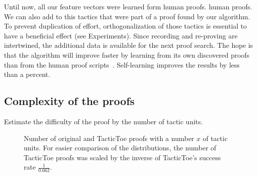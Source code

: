 \documentclass[runningheads,a4paper,draft]{svjour3}
\def\tactictoe{\textsf{TacticToe}\xspace}
\begin{document}
Until now, all our feature vectors were learned form human proofs. 
human proofs. We can also add to this tactics that were part of a proof found 
by our algorithm. To prevent duplication of effort, orthogonalization of those 
tactics is essential to have a beneficial effect (see Experiments).
Since recording and re-proving are intertwined, the 
additional data is available for the next proof search.
The hope is that the algorithm will improve faster by learning from its own 
discovered proofs than from the human proof 
scripts~\cite{DBLP:conf/cade/Urban07}. 
Self-learning improves the results by 
less than a percent.





\subsection{Complexity of the proofs}


Estimate the difficulty of the proof by the number of tactic units.


\begin{figure}[h]
\centering           
{}     
\caption{Number of original and \tactictoe proofs with a number $x$ of tactic 
units. For easier comparison of the distributions, the number of \tactictoe 
proofs was 
scaled by the inverse of \tactictoe's success rate $\frac{1}{0.662}$.}
\end{figure}
\end{document}
